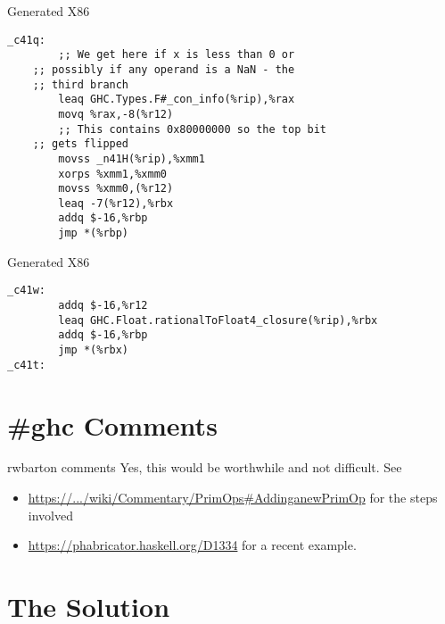 \documentclass[presentation]{beamer}
\begin{document}
\begin{frame}[fragile]{Generated X86}

\begin{lstlisting}
_c41q:
        ;; We get here if x is less than 0 or
	;; possibly if any operand is a NaN - the
	;; third branch
        leaq GHC.Types.F#_con_info(%rip),%rax
        movq %rax,-8(%r12)
        ;; This contains 0x80000000 so the top bit
	;; gets flipped
        movss _n41H(%rip),%xmm1
        xorps %xmm1,%xmm0
        movss %xmm0,(%r12)
        leaq -7(%r12),%rbx
        addq $-16,%rbp
        jmp *(%rbp)
\end{lstlisting}
\end{frame}

\begin{frame}[fragile]{Generated X86}

\begin{lstlisting}
_c41w:
        addq $-16,%r12
        leaq GHC.Float.rationalToFloat4_closure(%rip),%rbx
        addq $-16,%rbp
        jmp *(%rbx)
_c41t:
\end{lstlisting}
\end{frame}

\section{\#ghc Comments}
\begin{frame}[fragile]{rwbarton comments}
Yes, this would be worthwhile and not difficult. See

\begin{itemize}
\item
  \url{https://.../wiki/Commentary/PrimOps\#AddinganewPrimOp}
  for the steps involved
\item
  \url{https://phabricator.haskell.org/D1334} for a recent
  example.
\end{itemize}

\end{frame}

\section{The Solution}
\end{document}
